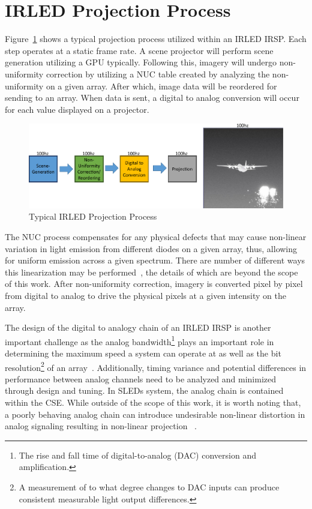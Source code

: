 \section{IRLED Projection Process}
    Figure~\ref{fig:typical_projection} shows a typical projection process utilized within an IRLED IRSP. Each step operates at a static frame rate. A scene projector will perform scene generation utilizing a GPU typically. Following this, imagery will undergo non-uniformity correction by utilizing a NUC table created by analyzing the non-uniformity on a given array. After which, image data will be reordered for sending to an array. When data is sent, a digital to analog conversion will occur for each value displayed on a projector.

    \begin{figure}
        \centering
        \includegraphics[width=1.0\textwidth]{fig/typical_projection_system.pdf}
        \caption{Typical IRLED Projection Process}
        \label{fig:typical_projection}
    \end{figure}

    The NUC process compensates for any physical defects that may cause non-linear variation in light emission from different diodes on a given array, thus, allowing for uniform emission across a given spectrum. There are number of different ways this linearization may be performed~\cite{BrowningEtAl2016, LandwehrEtAl2017, BarakhshanEtAl2018_2, BarakhshanEtAl2019, BarakhshanEtAl2019_2}, the details of which are beyond the scope of this work. After non-uniformity correction, imagery is converted pixel by pixel from digital to analog to drive the physical pixels at a given intensity on the array.

    The design of the digital to analogy chain of an IRLED IRSP is another important challenge as the analog bandwidth\footnote{The rise and fall time of digital-to-analog (DAC) conversion and amplification.} plays an important role in determining the maximum speed a system can operate at as well as the bit resolution\footnote{A measurement of to what degree changes to DAC inputs can produce consistent measurable light output differences.} of an array~\cite{EjzakEtAl2019}. Additionally, timing variance and potential differences in performance between analog channels need to be analyzed and minimized through design and tuning. In SLEDs system, the analog chain is contained within the CSE. While outside of the scope of this work, it is worth noting that, a poorly behaving analog chain can introduce undesirable non-linear distortion in analog signaling resulting in non-linear projection ~\cite{Freeman1977, Gordon1978, ChanEtAl2008}.

